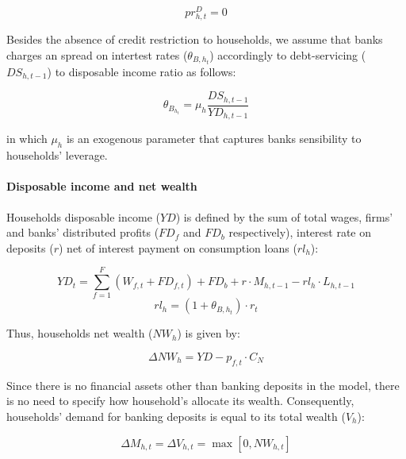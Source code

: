 \documentclass{SelfArx}
\begin{document}
\begin{latex}
\begin{equation}
pr^{D}_{h,t} = 0
\end{equation}
\end{latex}
Besides the absence of credit restriction to households, we assume that banks charges an spread on intertest rates (\(\theta_{B,h_{t}}\)) accordingly to debt-servicing (\(DS_{h,t-1}\)) to disposable income ratio as follows:

\begin{latex}
\begin{equation}
\theta_{B_{h_{t}}} = \mu_{h}\frac{DS_{h,t-1}}{YD_{h,t-1}}
\end{equation}
\end{latex}
in which \(\mu_{h}\) is an exogenous parameter that captures banks sensibility to households' leverage.

\paragraph*{Disposable income and net wealth}
\label{sec:orgfce57e0}

Households disposable income (\(YD\)) is defined by the sum of total wages, firms' and banks' distributed profits (\(FD_{f}\) and \(FD_{b}\) respectively), interest rate on deposits (\(r\)) net of interest payment on consumption loans (\(rl_{h}\)):

\begin{latex}
\begin{equation}
YD_{t} = \sum_{f=1}^{F}\left(W_{f,t} + FD_{f,t}\right) + FD_{b} + r\cdot M_{h,t-1} - rl_{h}\cdot L_{h,t-1}
\end{equation}
\begin{equation}
rl_{h} = (1+\theta_{B,h_{t}})\cdot r_{t}
\end{equation}
\end{latex}
Thus, households net wealth (\(NW_{h}\)) is given by:
\begin{latex}
\begin{equation}
\Delta NW_{h} = YD - p_{f,t}\cdot C_{N}
\end{equation}
\end{latex}
Since there is no financial assets other than banking deposits in the model, there is no need to specify how household's allocate its wealth.
Consequently, households' demand for banking deposits is equal to its total wealth (\(V_{h}\)):

\begin{latex}
\begin{equation}
\Delta M_{h,t} = \Delta V_{h,t} = \max [0, NW_{h,t}]
\end{equation}
\end{latex}
\end{document}
